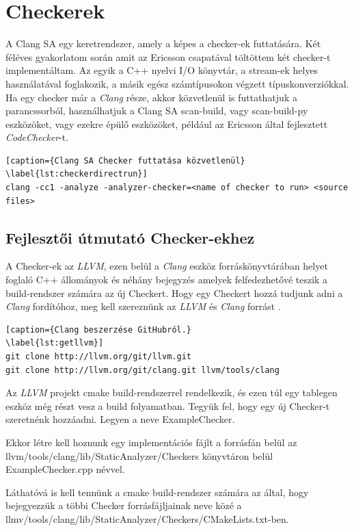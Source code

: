 \documentclass[a4paper,12pt]{report}
\begin{document}
\chapter{Checkerek}
A Clang SA egy keretrendszer, amely a képes a checker-ek futtatására. Két féléves gyakorlatom során amit az Ericsson csapatával töltöttem két checker-t implementáltam. Az egyik a C++ nyelvi I/O könyvtár, a stream-ek helyes használatával foglakozik, a másik egész számtípusokon végzett típuskonverziókkal.
Ha egy checker már a \emph{Clang} része, akkor közvetlenül is futtathatjuk a parancssorból, használhatjuk a Clang SA scan-build, vagy scan-build-py eszközöket, vagy ezekre épülő eszközöket, például az Ericsson által fejlesztett \emph{CodeChecker}-t.

\begin{lstlisting}[caption={Clang SA Checker futtatása közvetlenül}
\label{lst:checkerdirectrun}]
clang -cc1 -analyze -analyzer-checker=<name of checker to run> <source files>
\end{lstlisting}

\section{Fejlesztői útmutató Checker-ekhez}
A Checker-ek az \emph{LLVM}, ezen belül a \emph{Clang} eszköz forráskönyvtárában helyet foglaló C++ állományok és néhány bejegyzés amelyek felfedezhetővé teszik a build-rendszer számára az új Checkert. Hogy egy Checkert hozzá tudjunk adni a \emph{Clang} fordítóhoz, meg kell szereznünk az \emph{LLVM} és \emph{Clang} forrást \cite{getllvmpage}.

\begin{lstlisting}[caption={Clang beszerzése GitHubról.}
\label{lst:getllvm}]
git clone http://llvm.org/git/llvm.git
git clone http://llvm.org/git/clang.git llvm/tools/clang
\end{lstlisting}

Az \emph{LLVM} projekt cmake build-rendszerrel rendelkezik, és ezen túl egy tablegen eszköz még részt vesz a build folyamatban. Tegyük fel, hogy egy új Checker-t szeretnénk hozzáadni. Legyen a neve ExampleChecker.

Ekkor létre kell hoznunk egy implementációs fájlt a forrásfán belül az llvm/tools/clang/lib/StaticAnalyzer/Checkers könyvtáron belül ExampleChecker.cpp névvel.

Láthatóvá is kell tennünk a cmake build-rendszer számára az által, hogy bejegyezzük a többi Checker forrásfájljainak neve közé a llmv/tools/clang/lib/StaticAnalyzer/Checkers/CMakeLists.txt-ben.
\end{document}
